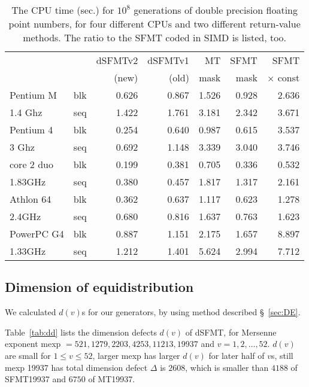 \documentclass{svmult}
\begin{document}
\begin{table}[h]
  \begin{center}
    \begin{tabular}{|ll|r|r|r|r|r|} \hline
      && dSFMTv2 & dSFMTv1 & MT & SFMT & SFMT \\
      && (new) & (old) & mask & mask & $\times$ const \\ \hline \hline
      Pentium M & blk & 0.626 & 0.867 & 1.526 & 0.928 & 2.636 \\
      1.4 Ghz & seq & 1.422 & 1.761 & 3.181 & 2.342 & 3.671 \\ \hline
      Pentium 4 & blk & 0.254 & 0.640 & 0.987 & 0.615 & 3.537 \\
      3 Ghz & seq & 0.692 & 1.148 & 3.339 & 3.040 & 3.746 \\ \hline
      core 2 duo & blk & 0.199 & 0.381 & 0.705 & 0.336 & 0.532 \\
      1.83GHz & seq & 0.380 & 0.457 & 1.817 & 1.317 & 2.161 \\\hline
      Athlon 64 & blk & 0.362 & 0.637 & 1.117 & 0.623 & 1.278 \\
      2.4GHz & seq & 0.680 & 0.816 & 1.637 & 0.763 & 1.623 \\ \hline
      PowerPC G4& blk & 0.887 & 1.151 & 2.175 & 1.657 & 8.897 \\
      1.33GHz & seq & 1.212 & 1.401 & 5.624 & 2.994 & 7.712 \\ \hline
    \end{tabular}
    \caption{The CPU time (sec.) for $10^8$ generations of double precision
      floating point numbers,
      for four different CPUs and two different return-value methods. 
      The ratio to the SFMT coded in SIMD is listed, too.}
    \label{tab:speed}
  \end{center}
\end{table}

\subsection{Dimension of equidistribution}
\label{sec:equidistribution}
We calculated $d(v)$s for our generators, by using method described 
\S~\ref{sec:DE}.

Table~\ref{tab:dd} lists the dimension defects $d(v)$ of dSFMT, for
Mersenne exponent mexp $= 521, 1279, 2203, 4253, 11213, 19937$ and
$v=1,2,\ldots, 52$.  $d(v)$ are small for $1 \le v \le 52$, larger mexp
has larger $d(v)$ for later half of $v$s, still mexp 19937 has total
dimension defect $\Delta$ is $2608$, which is smaller than $4188$ of
SFMT19937 and $6750$ of MT19937.
\end{document}
